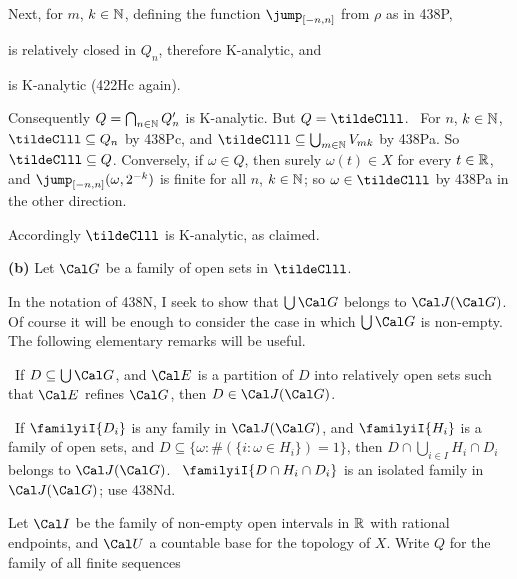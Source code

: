 { Next, for $m$, $k\in\Bbb N$, defining the function
$\jump_{[-n,n]}$ from $\rho$ as in 438P,


\noindent is relatively closed in $Q_n$, therefore K-analytic, and


\noindent is K-analytic (422Hc again).

\medskip

 Consequently $Q=\bigcap_{n\in\Bbb N}Q'_n$ is K-analytic.
But $Q=\tildeClll$.
\Prf\ For $n$, $k\in\Bbb N$, $\tildeClll\subseteq Q_n$ by 438Pc,
and $\tildeClll\subseteq\bigcup_{m\in\Bbb N}V_{mk}$ by 438Pa.
So $\tildeClll\subseteq Q$.
Conversely, if $\omega\in Q$, then surely
$\omega(t)\in X$ for every $t\in\Bbb R$, and
$\jump_{[-n,n]}(\omega,2^{-k})$ is finite for all $n$, $k\in\Bbb N$;  so
$\omega\in\tildeClll$ by 438Pa in the other direction.\ \Qed

Accordingly $\tildeClll$ is K-analytic, as claimed.

\medskip

{\bf (b)} Let $\Cal G$ be a family of open sets in $\tildeClll$.

\medskip

 In the
notation of 438N, I seek to show that $\bigcup\Cal G$ belongs to
$\Cal J(\Cal G)$.   Of course it will be enough to consider the case in
which $\bigcup\Cal G$ is non-empty.   The following elementary remarks
will be useful.

\medskip

\qquad\grheada\
If $D\subseteq\bigcup\Cal G$, and $\Cal E$ is a partition of
$D$ into relatively open sets such that $\Cal E$ refines $\Cal G$, then
$D\in\Cal J(\Cal G)$.

\medskip

\qquad\grheadb\ If $\familyiI{D_i}$ is any family in $\Cal J(\Cal G)$, and
$\familyiI{H_i}$ is a  family of open sets, and
$D\subseteq\{\omega:\#(\{i:\omega\in H_i\})=1\}$, then
$D\cap\bigcup_{i\in I}H_i\cap D_i$ belongs to
$\Cal J(\Cal G)$.   \Prf\ $\familyiI{D\cap H_i\cap D_i}$ is an isolated
family in $\Cal J(\Cal G)$;  use 438Nd.\ \Qed

\medskip

 Let $\Cal I$ be the family of non-empty open intervals in
$\Bbb R$ with rational endpoints, and $\Cal U$ a countable base for the
topology of $X$.   Write $Q$ for the family of all
finite sequences

}
